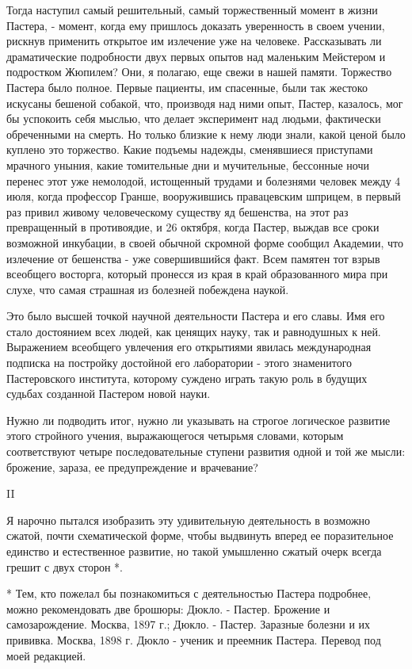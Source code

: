 Тогда наступил  самый решительный,  самый торжественный  момент в  жизни
Пастера, -  момент,  когда ему  пришлось  доказать уверенность  в  своем
учении,  рискнув  применить  открытое  им  излечение  уже  на  человеке.
Рассказывать  ли  драматические  подробности  двух  первых  опытов   над
маленьким Мейстером и подростком  Жюпилем? Они, я  полагаю, еще свежи  в
нашей  памяти.  Торжество  Пастера  было  полное.  Первые  пациенты,  им
спасенные, были так жестоко искусаны бешеной собакой, что, производя над
ними опыт, Пастер, казалось,  мог бы успокоить  себя мыслью, что  делает
эксперимент над  людьми, фактически  обреченными  на смерть.  Но  только
близкие к нему люди знали, какой ценой было куплено это торжество. Какие
подъемы  надежды,   сменявшиеся   приступами  мрачного   уныния,   какие
томительные  дни  и  мучительные,   бессонные  ночи  перенес  этот   уже
немолодой, истощенный трудами  и болезнями человек  между 4 июля,  когда
профессор Гранше, вооружившись правацевским шприцем, в первый раз привил
живому человеческому существу яд бешенства,  на этот раз превращенный  в
противоядие, и  26 октября,  когда Пастер,  выждав все  сроки  возможной
инкубации,  в  своей  обычной  скромной  форме  сообщил  Академии,   что
излечение от бешенства - уже совершившийся факт. Всем памятен тот  взрыв
всеобщего восторга, который пронесся из  края в край образованного  мира
при слухе, что самая страшная из болезней побеждена наукой.

Это было высшей точкой научной деятельности Пастера и его славы. Имя его
стало достоянием всех людей, как ценящих науку, так и равнодушных к ней.
Выражением всеобщего  увлечения  его  открытиями  явилась  международная
подписка на  постройку достойной  его  лаборатории -  этого  знаменитого
Пастеровского института, которому  суждено играть такую  роль в  будущих
судьбах созданной Пастером новой науки.

Нужно ли  подводить  итог,  нужно ли  указывать  на  строгое  логическое
развитие этого стройного учения, выражающегося четырьмя словами, которым
соответствуют четыре последовательные  ступени развития одной  и той  же
мысли: брожение, зараза, ее предупреждение и врачевание?

II

Я нарочно пытался  изобразить эту удивительную  деятельность в  возможно
сжатой,  почти   схематической   форме,  чтобы   выдвинуть   вперед   ее
поразительное единство  и  естественное  развитие,  но  такой  умышленно
сжатый очерк всегда грешит с двух сторон *.

* Тем, кто пожелал бы познакомиться с деятельностью Пастера подробнее,
можно рекомендовать две брошюры: Дюкло. - Пастер. Брожение и
самозарождение. Москва, 1897 г.;  Дюкло. - Пастер. Заразные болезни и
их прививка. Москва, 1898 г. Дюкло - ученик и преемник Пастера.
Перевод под моей редакцией.

